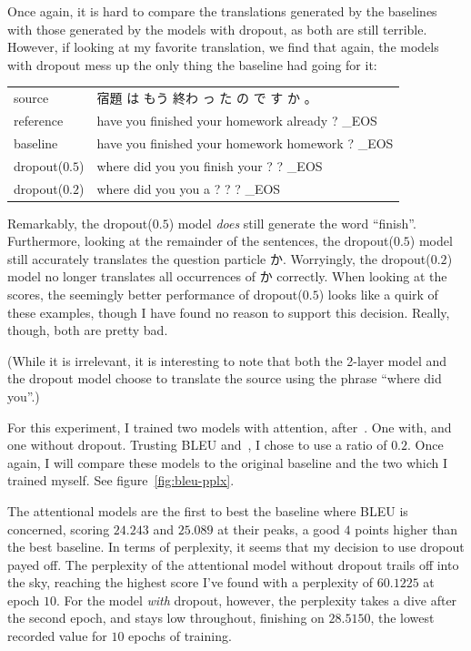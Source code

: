\documentclass[answers]{exam}
\begin{document}
\begin{CJK}{UTF8}{min}
\begin{questions}
\begin{framed}
  Once again, it is hard to compare the translations generated by the baselines
  with those generated by the models with dropout, as both are still terrible.
  However, if looking at my favorite translation, we find that again, the models
  with dropout mess up the only thing the baseline had going for it:

  \begin{tabular}{ll}
    source         & 宿題 は もう 終わ っ た の で す か 。\\
    reference      & have you finished your homework already ? \_EOS  \\
    baseline       & have you finished your homework homework ? \_EOS \\
    dropout($0.5$) & where did you you finish your ? ? \_EOS \\
    dropout($0.2$) & where did you you a ? ? ? \_EOS
  \end{tabular}

  Remarkably, the dropout($0.5$) model \emph{does} still generate the word
  ``finish''. Furthermore, looking at the remainder of the sentences, the
  dropout($0.5$) model still accurately translates the question particle か.
  Worryingly, the dropout($0.2$) model no longer translates all occurrences of
  か correctly. When looking at the scores, the seemingly better performance of
  dropout($0.5$) looks like a quirk of these examples, though I have found no
  reason to support this decision. Really, though, both are pretty bad.

  (While it is irrelevant, it is interesting to note that both the 2-layer model
  and the dropout model choose to translate the source using the phrase ``where
  did you''.)
\end{framed}



\begin{framed}
  For this experiment, I trained two models with attention,
  after~\citet{Luong-2015}. One with, and one without dropout. Trusting BLEU
  and~\citet{Zaremba-2014}, I chose to use a ratio of $0.2$. Once again, I will
  compare these models to the original baseline and the two which I trained
  myself. See figure~\ref{fig:bleu-pplx}.

  The attentional models are the first to best the baseline where BLEU is
  concerned, scoring $24.243$ and $25.089$ at their peaks, a good $4$ points
  higher than the best baseline. In terms of perplexity, it seems that my
  decision to use dropout payed off. The perplexity of the attentional model
  without dropout trails off into the sky, reaching the highest score I've found
  with a perplexity of $60.1225$ at epoch $10$. For the model \emph{with}
  dropout, however, the perplexity takes a dive after the second epoch, and
  stays low throughout, finishing on $28.5150$, the lowest recorded value for
  $10$ epochs of training.


\end{framed}
\end{questions}
\end{CJK}
\end{document}
